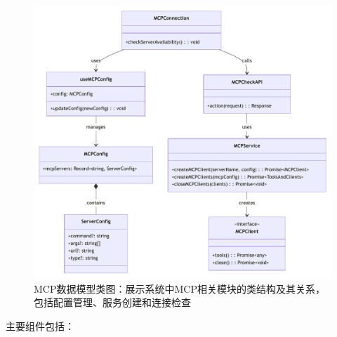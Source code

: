 \begin{figure}[H]
  \centering
  \includegraphics[width=\textwidth]{figures/mcp_class.pdf}
  \caption{MCP数据模型类图：展示系统中MCP相关模块的类结构及其关系，包括配置管理、服务创建和连接检查}
  \label{fig:mcp_class}
\end{figure}

主要组件包括：

